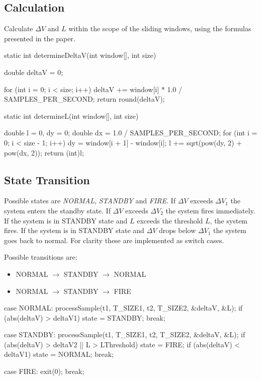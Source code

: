 \subsection{Calculation} Calculate $\Delta V$ and $L$ within the scope of the sliding windows, using the formulas presented in the paper. 

\begin{CCode}
    static int determineDeltaV(int window[], int size)
    {
    double deltaV = 0;

    for (int i = 0; i < size; i++)
    {
        deltaV += window[i] * 1.0 / SAMPLES_PER_SECOND;
    }
    return round(deltaV);
}

static int determineL(int window[], int size)
    {

    double l = 0, dy = 0;
    double dx = 1.0 / SAMPLES_PER_SECOND;
    for (int i = 0; i < size - 1; i++)
    {
        dy = window[i + 1] - window[i];
        l += sqrt(pow(dy, 2) + pow(dx, 2));
    }
    return (int)l;
}
\end{CCode}

\subsection{State Transition} Possible states are \emph{NORMAL}, \emph{STANDBY} and \emph{FIRE}. If $\Delta V$ exceeds $\Delta V_1$ the system enters the standby state. If $\Delta V$ exceeds $\Delta V_2$ the system fires immediately. If the system is in STANDBY state and $L$ exceeds the threshold $L$, the system fires. If the system is in STANDBY state and $\Delta V$ drops below $\Delta V_1$ the system goes back to normal. For clarity these are implemented as switch cases.

Possible transitions are: 
\begin{itemize}
\item NORMAL $\rightarrow$ STANDBY $\rightarrow$ NORMAL 
\item NORMAL $\rightarrow$ STANDBY $\rightarrow$ FIRE
\end{itemize}

\begin{CCode}
        case NORMAL:
            processSample(t1, T_SIZE1, t2, T_SIZE2, &deltaV, &L);
            if (abs(deltaV) > deltaV1)
            {
                state = STANDBY;
            }
            break;

        case STANDBY:
            processSample(t1, T_SIZE1, t2, T_SIZE2, &deltaV, &L);
            if (abs(deltaV) > deltaV2 || L > LThreshold)
            {
                state = FIRE;
            }
            if (abs(deltaV) < deltaV1)
            {
                state = NORMAL;
            }
            break;

        case FIRE:
            exit(0);
            break;  

\end{CCode}

